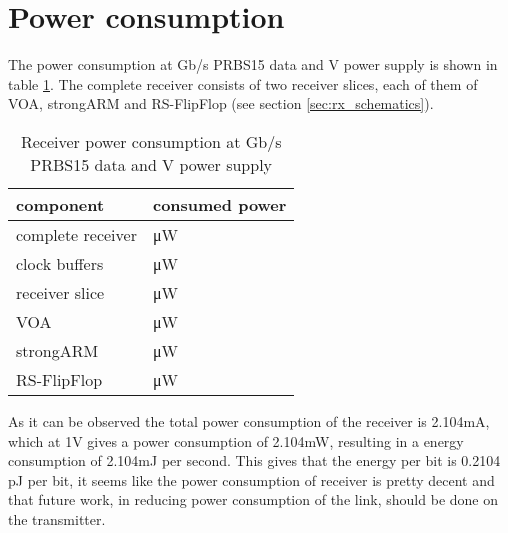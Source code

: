 \section{Power consumption}
The power consumption at \unit[10]{Gb/s} PRBS15 data and \unit[1]{V} power supply is shown in table \ref{tab:power_consumption}. The complete receiver consists of two receiver slices, each of them of VOA, strongARM and RS-FlipFlop (see section \ref{sec:rx_schematics}).

\begin{table}[H]
  \centering
  \begin{tabular}{l|l}
    component & consumed power\\
    \hline
    complete receiver & \unit[2104]{\uW}\\
    clock buffers & \unit[1814]{\uW}\\
    receiver slice & \unit[136,3]{\uW}\\
    VOA & \unit[32,58]{\uW}\\
    strongARM & \unit[46,07]{\uW}\\
    RS-FlipFlop & \unit[57,66]{\uW}\\
  \end{tabular}
  \caption{Receiver power consumption at \unit[10]{Gb/s} PRBS15 data and \unit[1]{V} power supply}
  \label{tab:power_consumption}
\end{table}

As it can be observed the total power consumption of the receiver is 2.104mA, which at 1V gives a power consumption of 2.104mW, resulting in a energy consumption of 2.104mJ per second. This gives that the energy per bit is 0.2104 pJ per bit, it seems like the power consumption of receiver is pretty decent and that future work, in reducing power consumption of the link, should be done on the transmitter.